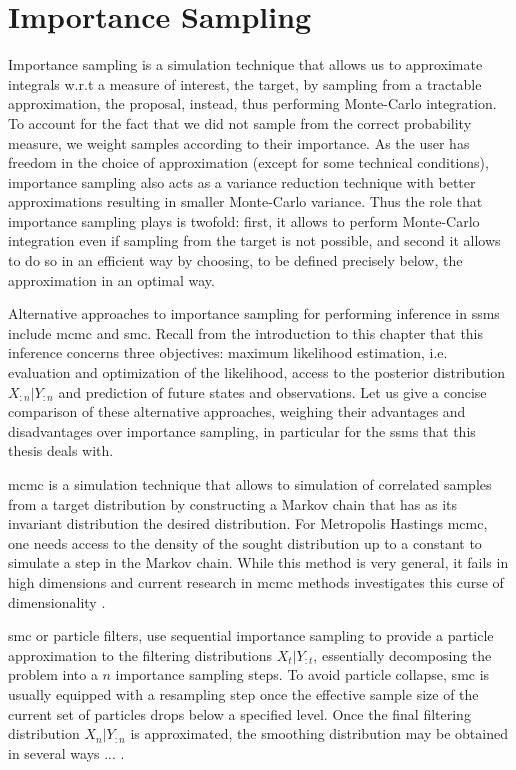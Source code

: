 
\section{Importance Sampling}
\label{sec:importance_sampling}
Importance sampling is a simulation technique that allows us to approximate integrals w.r.t a measure of interest, the target, by sampling from a tractable approximation, the proposal, instead, thus performing Monte-Carlo integration. To account for the fact that we did not sample from the correct probability measure, we weight samples according to their importance. As the user has freedom in the choice of approximation (except for some technical conditions), importance sampling also acts as a variance reduction technique with better approximations resulting in smaller Monte-Carlo variance. Thus the role that importance sampling plays is twofold: first, it allows to perform Monte-Carlo integration even if sampling from the target is not possible, and second it allows to do so in an efficient way by choosing, to be defined precisely below, the approximation in an optimal way.

Alternative approaches to importance sampling for performing inference in \glspl{ssm} include \gls{mcmc} and \gls{smc}. 
Recall from the introduction to this chapter that this inference concerns three objectives: maximum likelihood estimation, i.e. evaluation and optimization of the likelihood, access to the posterior distribution $X_{:n} | Y_{:n}$ and prediction of future states and observations. Let us give a concise comparison of these alternative approaches, weighing their advantages and disadvantages over importance sampling, in particular for the \glspl{ssm} that this thesis deals with. 

\gls{mcmc} \cite{Brooks2011Handbook} is a simulation technique that allows to simulation of correlated samples from a target distribution by constructing a Markov chain that has as its invariant distribution the desired distribution. For Metropolis Hastings \gls{mcmc}, one needs access to the density of the sought distribution up to a constant to simulate a step in the Markov chain. While this method is very general, it fails in high dimensions and current research in \gls{mcmc} methods investigates this  curse of dimensionality . 


\gls{smc} \cite{Chopin2020Introduction} or particle filters, use sequential importance sampling to provide a particle approximation to the filtering distributions $X_{t} | Y_{:t}$, essentially decomposing the problem into a $n$ importance sampling steps. 
To avoid particle collapse, \gls{smc} is usually equipped with a resampling step once the effective sample size of the current set of particles drops below a specified level. Once the final filtering distribution $X_{n}|Y_{:n}$ is approximated, the smoothing distribution may be obtained in several ways ... .

